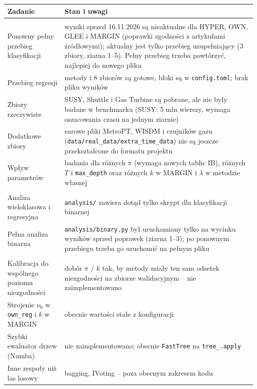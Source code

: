 \documentclass{article}
\newcommand{\code}[1]{\texttt{#1}}
\begin{document}
\begin{table}[H]
\centering
\footnotesize
\begin{tabularx}{\textwidth}{@{}>{\raggedright\arraybackslash}p{4.6cm}X@{}}
\toprule
\textbf{Zadanie} & \textbf{Stan i uwagi} \\
\midrule
\multicolumn{2}{@{}l}{\textit{Eksperymenty}} \\
Ponowny pełny przebieg klasyfikacji &
wyniki sprzed 16.11.2026 są nieaktualne dla HYPER, OWN, GLEE i MARGIN (poprawki zgodności
z artykułami źródłowymi); aktualny jest tylko przebieg uzupełniający (3 zbiory, ziarna
1--5). Pełny przebieg trzeba powtórzyć, najlepiej do nowego pliku \\
Przebieg regresji &
metody i 8 zbiorów są gotowe, bloki są w \code{config.toml}; brak pliku wyników \\
Zbiory rzeczywiste &
SUSY, Shuttle i Gas Turbine są pobrane, ale nie były badane w benchmarku (SUSY: 5 mln
wierszy, wymaga oszacowania czasu na jednym ziarnie) \\
Dodatkowe zbiory &
surowe pliki MetroPT, WISDM i czujników gazu (\code{data/real\_data/extra\_time\_data})
nie są jeszcze przekształcone do formatu projektu \\
Wpływ parametrów &
badania dla różnych $\pi$ (wymaga nowych tablic IB), różnych $T$ i \code{max\_depth}
oraz różnych $k$ w MARGIN i $\lambda$ w metodzie własnej \\
\midrule
\multicolumn{2}{@{}l}{\textit{Analiza}} \\
Analiza wieloklasowa i regresyjna &
\code{analysis/} zawiera dotąd tylko skrypt dla klasyfikacji binarnej \\
Pełna analiza binarna &
\code{analysis/binary.py} był uruchamiany tylko na wycinku wyników sprzed poprawek
(ziarna 1--3); po ponownym przebiegu trzeba go uruchomić na pełnym pliku \\
\midrule
\multicolumn{2}{@{}l}{\textit{Elementy dokumentu projektu (etap 2)}} \\
Kalibracja do wspólnego poziomu niezgodności &
dobór $\pi$ / $k$ tak, by metody miały ten sam odsetek niezgodności na zbiorze
walidacyjnym -- nie zaimplementowano \\
Strojenie $\nu_0$ w \code{own\_reg} i $k$ w MARGIN &
obecnie wartości stałe z konfiguracji \\
Szybki ewaluator drzew (Numba) &
nie zaimplementowano; obecnie \code{FastTree} na \code{tree\_.apply} \\
Inne zespoły niż las losowy &
bagging, IVoting -- poza obecnym zakresem kodu \\
\bottomrule
\end{tabularx}
\end{table}
\end{document}
